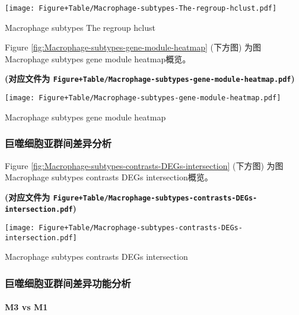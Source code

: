 \documentclass[
]{article}
\begin{document}
\def\@captype{figure}
\begin{center}
\texttt{[image: Figure+Table/Macrophage-subtypes-The-regroup-hclust.pdf]}
\caption{Macrophage subtypes The regroup hclust}\label{fig:Macrophage-subtypes-The-regroup-hclust}
\end{center}

Figure \ref{fig:Macrophage-subtypes-gene-module-heatmap} (下方图) 为图Macrophage subtypes gene module heatmap概览。

\textbf{(对应文件为 \texttt{Figure+Table/Macrophage-subtypes-gene-module-heatmap.pdf})}

\def\@captype{figure}
\begin{center}
\texttt{[image: Figure+Table/Macrophage-subtypes-gene-module-heatmap.pdf]}
\caption{Macrophage subtypes gene module heatmap}\label{fig:Macrophage-subtypes-gene-module-heatmap}
\end{center}

\hypertarget{ux5de8ux566cux7ec6ux80deux4e9aux7fa4ux95f4ux5deeux5f02ux5206ux6790}{%
\subsubsection{巨噬细胞亚群间差异分析}\label{ux5de8ux566cux7ec6ux80deux4e9aux7fa4ux95f4ux5deeux5f02ux5206ux6790}}

Figure \ref{fig:Macrophage-subtypes-contrasts-DEGs-intersection} (下方图) 为图Macrophage subtypes contrasts DEGs intersection概览。

\textbf{(对应文件为 \texttt{Figure+Table/Macrophage-subtypes-contrasts-DEGs-intersection.pdf})}

\def\@captype{figure}
\begin{center}
\texttt{[image: Figure+Table/Macrophage-subtypes-contrasts-DEGs-intersection.pdf]}
\caption{Macrophage subtypes contrasts DEGs intersection}\label{fig:Macrophage-subtypes-contrasts-DEGs-intersection}
\end{center}

\hypertarget{ux5de8ux566cux7ec6ux80deux4e9aux7fa4ux95f4ux5deeux5f02ux529fux80fdux5206ux6790}{%
\subsubsection{巨噬细胞亚群间差异功能分析}\label{ux5de8ux566cux7ec6ux80deux4e9aux7fa4ux95f4ux5deeux5f02ux529fux80fdux5206ux6790}}

\hypertarget{m3-vs-m1}{%
\paragraph{M3 vs M1}\label{m3-vs-m1}}
\end{document}
